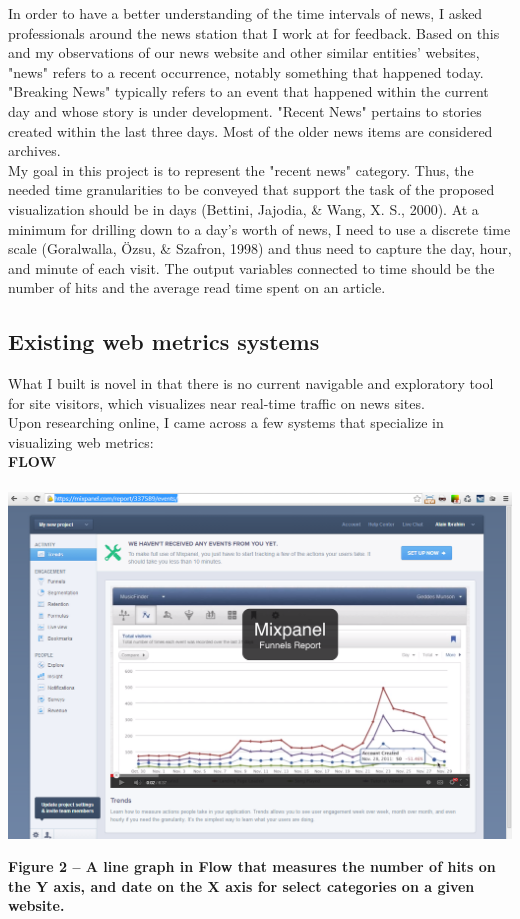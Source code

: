 \documentclass[12pt]{article}
\begin{document}
In order to have a better understanding of the time intervals of news, I asked professionals around the news station that I work at for feedback. Based on this and my observations of our news website and other similar entities' websites, "news" refers to a recent occurrence, notably something that happened today. "Breaking News" typically refers to an event that happened within the current day and whose story is under development. "Recent News" pertains to stories created within the last three days. Most of the older news items are considered archives. \\
 My goal in this project is to represent the "recent news" category. Thus, the needed time granularities to be conveyed that support the task of the proposed visualization should be in days (Bettini, Jajodia, \& Wang, X. S., 2000). At a minimum for drilling down to a day's worth of news, I need to use a discrete time scale (Goralwalla, \"{O}zsu, \& Szafron, 1998) and thus need to capture the day, hour, and minute of each visit. The output variables connected to time should be the number of hits and the average read time spent on an article.

\newpage

\subsection{Existing web metrics systems}
What I built is novel in that there is no current navigable and exploratory tool for site visitors, which visualizes near real-time traffic on news sites. \\
Upon researching online, I came across a few systems that specialize in visualizing web metrics: \\

\noindent\textbf{FLOW} \\ \\
\noindent\includegraphics[scale=0.45]{img/flow}
\begin{singlespace}
\noindent\textbf{Figure 2 -- A line graph in Flow that measures the number of hits on the Y axis, and date on the X axis for select categories on a given website.} \\
\end{singlespace}
\end{document}
